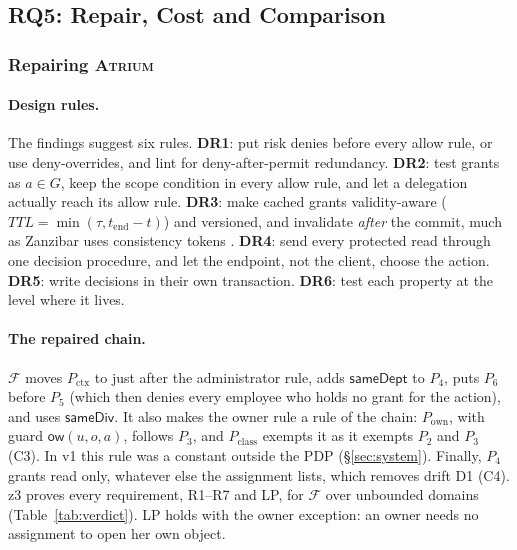 \documentclass[sigconf,review,anonymous]{acmart}
\newcommand{\sysname}{\textsc{Atrium}\xspace}
\newcommand{\sysname}{\textsc{OpenZTAC}\xspace}
\newcommand{\Pc}{P_{\mathrm{class}}}
\newcommand{\Px}{P_{\mathrm{ctx}}}
\newcommand{\Po}{P_{\mathrm{own}}}
\newcommand{\ow}{\mathsf{ow}}
\newcommand{\sameDept}{\mathsf{sameDept}}
\newcommand{\sameDiv}{\mathsf{sameDiv}}
\begin{document}
\subsection{RQ5: Repair, Cost and Comparison}
\label{sec:rq5}

\subsubsection{Repairing \sysname}

\paragraph{Design rules.} The findings suggest six rules.
\textbf{DR1}: put risk denies before every allow rule, or use deny-overrides, and lint for deny-after-permit
redundancy.
\textbf{DR2}: test grants as $a\in G$, keep the scope condition in every allow rule, and let a delegation
actually reach its allow rule.
\textbf{DR3}: make cached grants validity-aware ($\mathit{TTL}=\min(\tau,t_{\mathrm{end}}-t)$) and versioned, and
invalidate \emph{after} the commit, much as Zanzibar uses consistency tokens \cite{pang2019zanzibar}.
\textbf{DR4}: send every protected read through one decision procedure, and let the endpoint, not the client,
choose the action.
\textbf{DR5}: write decisions in their own transaction.
\textbf{DR6}: test each property at the level where it lives.

\paragraph{The repaired chain.} $\mathcal{F}$ moves $\Px$ to just after the administrator rule, adds $\sameDept$ to
$P_4$, puts $P_6$ before $P_5$ (which then denies every employee who holds no grant for the action), and uses
$\sameDiv$. It also makes the owner rule a rule of the chain: $\Po$, with guard $\ow(u,o,a)$, follows $P_3$, and
$\Pc$ exempts it as it exempts $P_2$ and $P_3$ (C3). In v1 this rule was a constant outside the PDP
(\S\ref{sec:system}). Finally, $P_4$ grants read only, whatever else the assignment lists, which removes drift D1
(C4). z3 proves every requirement, R1--R7 and LP, for $\mathcal{F}$ over unbounded domains
(Table~\ref{tab:verdict}). LP holds with the owner exception: an owner needs no assignment to open her own
object.
\end{document}
